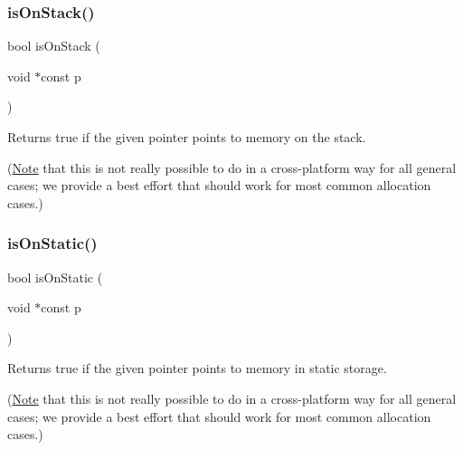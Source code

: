 \subsubsection{\texorpdfstring{is\+On\+Stack()}{isOnStack()}}
{\footnotesize\ttfamily bool is\+On\+Stack (\begin{DoxyParamCaption}\item[{void $\ast$const}]{p }\end{DoxyParamCaption})}



Returns true if the given pointer points to memory on the stack. 

(\mbox{\hyperlink{classNote}{Note}} that this is not really possible to do in a cross-\/platform way for all general cases; we provide a best effort that should work for most common allocation cases.) \mbox{\label{namespacestanfordcpplib_1_1memory_a9ab578894aae2eb9ce5cc01058ab2a20}} 
\subsubsection{\texorpdfstring{is\+On\+Static()}{isOnStatic()}}
{\footnotesize\ttfamily bool is\+On\+Static (\begin{DoxyParamCaption}\item[{void $\ast$const}]{p }\end{DoxyParamCaption})}



Returns true if the given pointer points to memory in static storage. 

(\mbox{\hyperlink{classNote}{Note}} that this is not really possible to do in a cross-\/platform way for all general cases; we provide a best effort that should work for most common allocation cases.) 